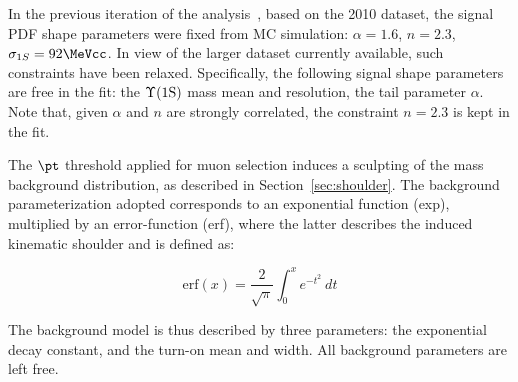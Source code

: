 
In the previous iteration of the analysis~\cite{prl}, based on the 2010 dataset, 
the signal PDF shape parameters were fixed from MC simulation: $\alpha=1.6$, $n=2.3$, $\sigma_{1S}=92\MeVcc$. 
%
In view of the larger dataset currently available, such constraints have been relaxed. %
Specifically, the following signal shape parameters are free in the fit:
the $\Upsilon\text{(1S)}$ mass mean and resolution, the tail parameter $\alpha$.
Note that, given $\alpha$ and $n$ are strongly correlated, the constraint $n=2.3$ is kept in the fit. 


The $\pt$ threshold applied for muon selection induces a sculpting of the mass background distribution, as described in Section~\ref{sec:shoulder}.  
The background parameterization adopted corresponds to an exponential function (exp), multiplied by an error-function (erf), where the latter describes the induced kinematic shoulder and is defined as:
%
\begin{linenomath}
\begin{equation}
\mbox{erf}(x)=\frac{2}{\sqrt{\pi}}\int_0^x e^{-t^2} \: dt
\end{equation}
\end{linenomath}
%
The background model is thus described by three parameters: the exponential decay constant, and the turn-on mean and width. All background parameters are left free. %

